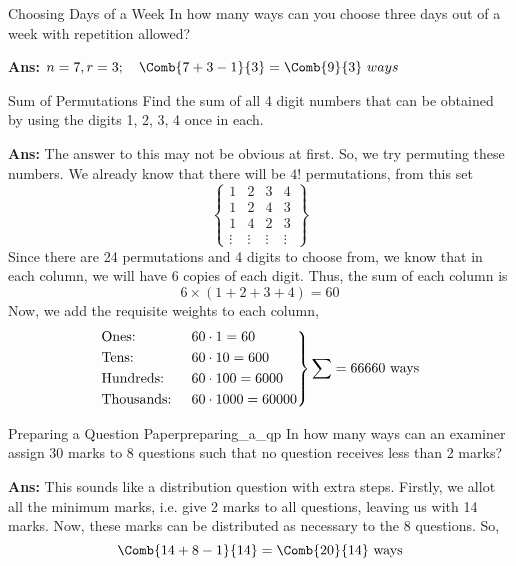 \begin{exampletcb}
    {Choosing Days of a Week}{}
    In how many ways can you choose three days out of a week with repetition allowed?

    \textbf{Ans:} \mbox{$n=7,r=3;\quad \Comb{7+3-1}{3} = \Comb{9}{3}\ ways$}
\end{exampletcb}

\begin{exampletcb}
    {Sum of Permutations}{}
    Find the sum of all 4 digit numbers that can be obtained by using the digits 1, 2, 3, 4 once in each.

    \textbf{Ans:} The answer to this may not be obvious at first. So, we try permuting these numbers. We already know that there will be \mbox{$4!$} permutations, from this set
    \[
        \begin{Bmatrix}
            1      & 2      & 3      & 4      \\
            1      & 2      & 4      & 3      \\
            1      & 4      & 2      & 3      \\
            \vdots & \vdots & \vdots & \vdots
        \end{Bmatrix}
    \]
    Since there are 24 permutations and 4 digits to choose from, we know that in each column, we will have 6 copies of each digit. Thus, the sum of each column is
    \[
        6\times(1+2+3+4) = 60
    \]
    Now, we add the requisite weights to each column,
    \[
        \begin{rcases}
            \text{Ones: }      & 60 \cdot 1 = 60       \\
            \text{Tens: }      & 60 \cdot 10 = 600     \\
            \text{Hundreds: }  & 60 \cdot 100 = 6000   \\
            \text{Thousands: } & 60 \cdot 1000 = 60000
        \end{rcases} \sum = 66660 \text{ ways}
    \]
\end{exampletcb}



\begin{exampletcb}
    {Preparing a Question Paper}{preparing_a_qp}
    In how many ways can an examiner assign 30 marks to 8 questions such that no question receives less than 2 marks?

    \textbf{Ans:} This sounds like a distribution question with extra steps. Firstly, we allot all the minimum marks, i.e. give 2 marks to all questions, leaving us with 14 marks. Now, these marks can be distributed as necessary to the 8 questions. So,
    \[
        \Comb{14+8-1}{14} = \Comb{20}{14} \text{ ways}
    \]
\end{exampletcb}



